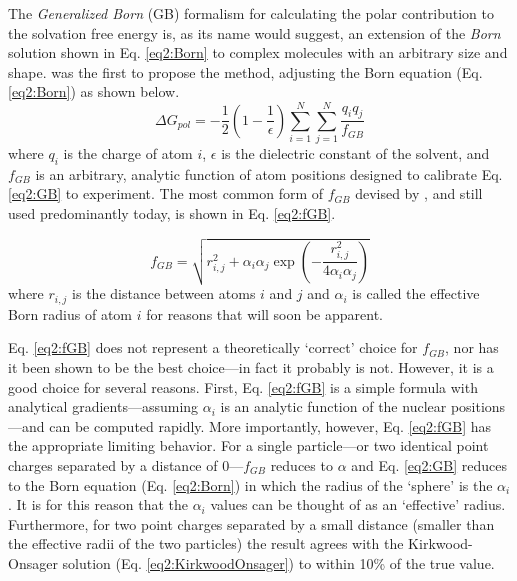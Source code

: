 The \emph{Generalized Born} (GB) formalism for calculating the polar
contribution to the solvation free energy is, as its name would suggest, an
extension of the \emph{Born} solution shown in Eq. \ref{eq2:Born} to complex
molecules with an arbitrary size and shape.
\cite{Still_JAmChemSoc_1990_v112_p6127, Qiu_JPhysChemA_1997_v101_p3005,
Onufriev_JPhysChemB_2000_v104_p3712, Bashford_AnnuRevPhysChem_2000_v51_p129,
Onufriev_JComputChem_2002_v23_p1297}
\citeauthor{Still_JAmChemSoc_1990_v112_p6127} was the first to propose the
method, adjusting the Born equation (Eq. \ref{eq2:Born}) as shown below.
\cite{Still_JAmChemSoc_1990_v112_p6127}
\begin{equation}
   \Delta G _ {pol} = -\frac 1 2 \left( 1 - \frac 1 {\epsilon} \right)
      \sum_{i=1}^N \sum_{j=1}^N \frac {q_i q_j} {f_{GB}}
   \label{eq2:GB}
\end{equation}
where $q_i$ is the charge of atom $i$, $\epsilon$ is the dielectric constant of
the solvent, and $f_{GB}$ is an arbitrary, analytic function of atom positions
designed to calibrate Eq. \ref{eq2:GB} to experiment. The most common form of
$f_{GB}$ devised by \citeauthor{Still_JAmChemSoc_1990_v112_p6127}, and still
used predominantly today, is shown in Eq. \ref{eq2:fGB}.

\begin{equation}
   f_{GB} = \sqrt{r_{i,j}^2 + \alpha_i \alpha_j \exp \left( - \frac {r_{i,j}^2}
            {4 \alpha_i \alpha_j} \right)}
   \label{eq2:fGB}
\end{equation}
where $r_{i,j}$ is the distance between atoms $i$ and $j$ and $\alpha_i$ is
called the effective Born radius of atom $i$ for reasons that will soon be
apparent.

Eq. \ref{eq2:fGB} does not represent a theoretically `correct' choice for
$f_{GB}$, nor has it been shown to be the best choice---in fact it probably is
not. \cite{Onufriev_JChemPhys_2011_v134_p164104} However, it is a good choice
for several reasons. First, Eq. \ref{eq2:fGB} is a simple formula with
analytical gradients---assuming $\alpha_i$ is an analytic function of the
nuclear positions---and can be computed rapidly. More importantly, however, Eq.
\ref{eq2:fGB} has the appropriate limiting behavior.
\cite{Still_JAmChemSoc_1990_v112_p6127} For a single particle---or two identical
point charges separated by a distance of 0---$f_{GB}$ reduces to $\alpha$ and
Eq. \ref{eq2:GB} reduces to the Born equation (Eq. \ref{eq2:Born}) in which the
radius of the `sphere' is the $\alpha_i$. It is for this reason that the
$\alpha_i$ values can be thought of as an `effective' radius. Furthermore, for
two point charges separated by a small distance (\ie smaller than the effective
radii of the two particles) the result agrees with the Kirkwood-Onsager solution
(Eq. \ref{eq2:KirkwoodOnsager}) to within 10\% of the true value.
\cite{Still_JAmChemSoc_1990_v112_p6127}

